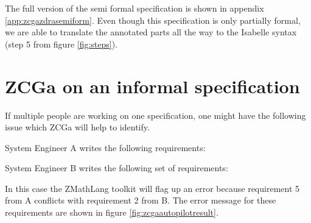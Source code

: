 The full version of the semi formal specification is shown in appendix
\ref{app:zcgazdrasemiform}. Even though this specification is only partially
formal, we are able to translate the annotated parts all the way to the Isabelle
syntax (step 5 from figure \ref{fig:steps}).

\section{ZCGa on an informal specification}

If multiple people are working on one specification, one might have the
following issue which ZCGa will help to identify.

System Engineer A writes the following requirements:

 \noindent{}

 System Engineer B writes the following set of requirements:


 \noindent{}


 In this case the ZMathLang toolkit will flag up an error because requirement 5
 from A conflicts with requirement 2 from B.  The error message for these
 requirements are shown in figure \ref{fig:zcgaautopilotresult}.

